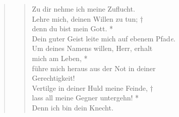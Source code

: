 \begin{quote}
\begin{verse}
Zu dir nehme ich meine Zuflucht.\\
\vin Lehre mich, deinen Willen zu tun; †\\ \vin denn  du bist mein Gott. *\\
\vin Dein guter Geist leite mich auf ebenem Pfad\textit{e}.\\ 
Um deines Namens willen, Herr, erhalt\\mich am Leben, *\\
führe mich heraus aus der Not in deiner\\ Gerechtigkeit!\\
\vin Vertilge in deiner Huld meine Feinde, †\\
\vin lass all meine Gegner untergehn! * \\ \vin Denn ich bin dein Knecht. \\


\end{verse}

\end{quote}




\vspace{0.3cm}
\def\greinitialformat#1{{\fontsize{40}{40}\selectfont #1}}
\gresetfirstlineaboveinitial{\small \textcolor{red}{Ex 15}}{}
\setaboveinitialseparation{0.72mm}

\vspace{0.3cm}


